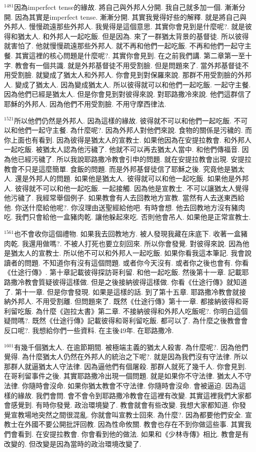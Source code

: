 \documentclass{book}
\begin{document}
$^{1481}$因為imperfect tense的緣故.
將自己與外邦人分開.
我自己就多加一個.
漸漸分開.
因為其實是imperfect tense.
漸漸分開.
其實我覺得好些的解釋.
就是將自己與外邦人.
慢慢疏遠那些外邦人.
我覺得是這個意思.
其實你會見到是什麼呢?.
就是彼得和猶太人.
和外邦人一起吃飯.
但是因為.
來了一群猶太背景的基督徒.
所以彼得就害怕了.
他就慢慢疏遠那些外邦人.
就不再和他們一起吃飯.
不再和他們一起守主餐.
其實這裡的核心問題是什麼呢?.
其實你會見到.
在之前我們講.
第二章第一至十字.
教會有一個共識.
就是外邦基督徒不用受割臉.
但是問題來了.
當外邦基督徒不用受割臉.
就變成了猶太人和外邦人.
你會見到對保羅來說.
那群不用受割臉的外邦人.
變成了猶太人.
因為變成猶太人.
所以彼得就可以和他們一起吃飯.
一起守主餐.
因為他們已經是猶太人.
但是你會見到對彼得來說.
對耶路撒冷來說.
他們這群信了耶穌的外邦人.
因為他們不用受割臉.
不用守摩西律法.

$^{1521}$所以他們仍然是外邦人.
因為這樣的緣故.
彼得就不可以和他們一起吃飯.
不可以和他們一起守主餐.
為什麼呢?.
因為外邦人對他們來說.
食物的關係是污穢的.
而你上面也有看到.
因為彼得是猶太人的宣教士.
如果他因為在安提拉教會.
和外邦人一起吃飯.
被猶太人認為他污穢了.
他就不可以再去猶太人當中.
和他們傳福音.
因為他已經污穢了.
所以我說耶路撒冷教會引申的問題.
就在安提拉教會出現.
安提拉教會不只是這麼簡單.
食飯的問題.
而是外邦基督徒信了耶穌之後.
究竟他是猶太人.
還是外邦人的問題.
如果他是猶太人.
彼得就可以和他一起吃飯.
如果他是外邦人.
彼得就不可以和他一起吃飯.
一起接觸.
因為他是宣教士.
不可以讓猶太人覺得他污穢了.
我經常舉個例子.
如果教會有人去回教地方宣教.
當然有人去送東西給他.
你送什麼給他呢?.
你沒理由送聖經給他吧.
有時會想.
他去回教地方沒有豬肉吃.
我們只會給他一盒豬肉乾.
讓他躲起來吃.
否則他會吊人.
如果他是正常宣教士.

$^{1561}$也不會收你這個禮物.
如果我去回教地方.
被人發現我藏在床底下.
收著一盒豬肉乾.
我還用做嗎?.
不被人打死也要立刻回來.
所以你會發覺.
對彼得來說.
因為他是猶太人的宣教士.
所以他不可以和外邦人一起吃飯.
如果你看我這本筆記.
我會說讀者的問題.
不知道你有沒有這個問題.
或者你今天沒有.
或者你之後也會有.
你看《仕途行傳》.
第十章記載彼得探訪哥利留.
和他一起吃飯.
然後第十一章.
記載耶路撒冷教會質疑彼得這樣做.
但是之後接納彼得這樣做.
你看《仕途行傳》就知道了.
第十一章.
但是你會發現.
如果是這樣的話.
到了第十五章.
耶路撒冷教會就接納外邦人.
不用受割離.
但問題來了.
既然《仕途行傳》第十一章.
都接納彼得和哥利留吃飯.
為什麼《迦拉太書》第二章.
不接納彼得和外邦人吃飯呢?.
你明白這個疑問嗎?.
既然《仕途行傳》記載彼得和哥利留吃飯.
都可以了.
為什麼之後教會會反口呢?.
我想給你們一些資料.
在主後49年.
在耶路撒冷.

$^{1601}$有幾千個猶太人.
在逾節期間.
被極端主義的猶太人殺害.
為什麼呢?.
因為他們覺得.
為什麼猶太人仍然在外邦人的統治之下呢?.
就是因為我們沒有守法律.
所以那群人就逼猶太人守法律.
因為逼他們有個屠殺.
那群人就死了幾千人.
你會見到.
在哥利留事件之後.
其實耶路撒冷出現一個問題.
就是如果你不守法律.
猶太人不守法律.
你隨時會沒命.
如果你猶太教會不守法律.
你隨時會沒命.
會被逼迫.
因為這樣的緣故.
我們會問.
會不會令到耶路撒冷教會在這裡有改變.
其實這裡我們大家都會感覺到.
有時你發覺.
政治環境變了.
教會就會有些改變.
我想大家都知道.
你發覺宣教場地突然之間很混亂.
你就會叫宣教士回來.
為什麼?.
因為都要他們安全.
宣教士在外國不要公開批評回教.
因為性命攸關.
教會也存在不到你做這些事.
其實我們會看到.
在安提拉教會.
你會看到他的做法.
如果和《少林寺傳》相比.
教會是有改變的.
但改變是因為當時的政治環境改變了.
\end{document}
